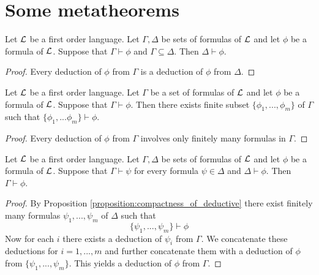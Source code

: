 \section{Some metatheorems}

\begin{proposition}\label{proposition:monotonicity_of_deductive}
Let ${\mathcal L}$ be a first order language. Let $\Gamma, \Delta$ be sets of formulas of ${\mathcal L}$ and let $\phi$ be a formula of ${\mathcal L}$. Suppose that $\Gamma \vdash \phi$ and $\Gamma \subseteq \Delta$. Then $\Delta \vdash \phi$.
\end{proposition}
\begin{proof}
Every deduction of $\phi$ from $\Gamma$ is a deduction of $\phi$ from $\Delta$.
\end{proof}

\begin{proposition}\label{proposition:compactness_of_deductive}
Let ${\mathcal L}$ be a first order language. Let $\Gamma$ be a set of formulas of ${\mathcal L}$ and let $\phi$ be a formula of ${\mathcal L}$. Suppose that $\Gamma \vdash \phi$. Then there exists finite subset $\{\phi_1,..., \phi_m\}$ of $\Gamma$ such that $\{\phi_1, ...\phi_m\} \vdash \phi$.
\end{proposition}
\begin{proof}
Every deduction of $\phi$ from $\Gamma$ involves only finitely many formulas in $\Gamma$.
\end{proof}

\begin{proposition}\label{proposition:transitivity_of_deductive}
Let ${\mathcal L}$ be a first order language. Let $\Gamma, \Delta$ be sets of formulas of ${\mathcal L}$ and let $\phi$ be a formula of ${\mathcal L}$. Suppose that $\Gamma \vdash \psi$ for every formula $\psi \in \Delta$ and $\Delta \vdash \phi$. Then $\Gamma \vdash \phi$.
\end{proposition}
\begin{proof}
By Proposition \ref{proposition:compactness_of_deductive} there exist finitely many formulas $\psi_1,...,\psi_m$ of $\Delta$ such that
$$\{\psi_1,...,\psi_m\} \vdash \phi$$
Now for each $i$ there exists a deduction of $\psi_i$ from $\Gamma$. We concatenate these deductions for $i = 1,...,m$ and further concatenate them with a deduction of $\phi$ from $\{\psi_1,...,\psi_m\}$. This yields a deduction of $\phi$ from $\Gamma$.
\end{proof}

